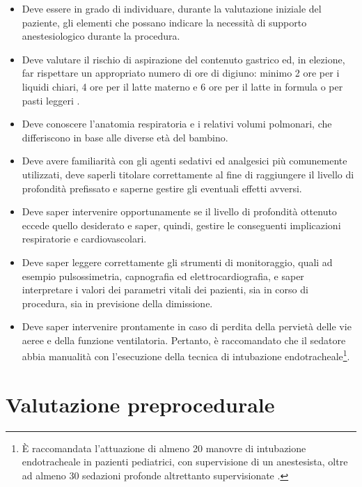 \begin{itemize}
    \item Deve essere in grado di individuare, durante la valutazione iniziale del paziente, gli elementi che possano indicare la necessità di supporto anestesiologico durante la procedura.
    \item Deve valutare il rischio di aspirazione del contenuto gastrico ed, in elezione, far rispettare un appropriato numero di ore di digiuno: minimo 2 ore per i liquidi chiari, 4 ore per il latte materno e 6 ore per il latte in formula o per pasti leggeri \cite{Guidelines2019}. 
    \item Deve conoscere l'anatomia respiratoria e i relativi volumi polmonari, che differiscono in base alle diverse età del bambino. 
    \item Deve avere familiarità con gli agenti sedativi ed analgesici più comunemente utilizzati, deve saperli titolare correttamente al fine di raggiungere il livello di profondità prefissato e saperne gestire gli eventuali effetti avversi. 
    \item Deve saper intervenire opportunamente se il livello di profondità ottenuto eccede quello desiderato e saper, quindi, gestire le conseguenti implicazioni respiratorie e cardiovascolari. 
    \item Deve saper leggere correttamente gli strumenti di monitoraggio, quali ad esempio pulsossimetria, capnografia ed elettrocardiografia, e saper interpretare i valori dei parametri vitali dei pazienti, sia in corso di procedura, sia in previsione della dimissione. 
    \item Deve saper intervenire prontamente in caso di perdita della pervietà delle vie aeree e della funzione ventilatoria. Pertanto, è raccomandato che il sedatore abbia manualità con l'esecuzione della tecnica di intubazione endotracheale\footnote{\`E raccomandata l'attuazione di almeno 20 manovre di intubazione endotracheale in pazienti pediatrici, con supervisione di un anestesista, oltre ad almeno 30 sedazioni profonde altrettanto supervisionate \cite{Simeupsedazione}.}.
\end{itemize}

\section{Valutazione preprocedurale}

